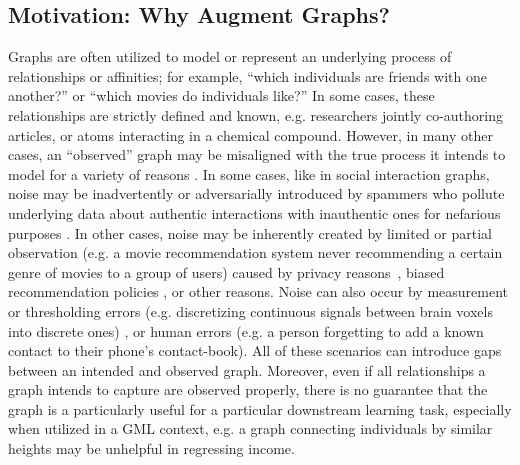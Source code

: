 \documentclass[11pt]{article}
\begin{document}
\subsection{Motivation: Why Augment Graphs?}
Graphs are often utilized to model or represent an underlying process of relationships or affinities; for example, ``which individuals are friends with one another?'' or ``which movies do individuals like?''  In some cases, these relationships are strictly defined and known, e.g. researchers jointly co-authoring articles, or atoms interacting in a chemical compound.  However, in many other cases, an ``observed'' graph may be misaligned with the true process it intends to model for a variety of reasons \cite{brugere2018network}.  In some cases, like in social interaction graphs, noise may be inadvertently or adversarially introduced by spammers who pollute underlying data about authentic interactions with inauthentic ones for nefarious purposes \cite{shah2014spotting, kumar2018false}.  In other cases, noise may be inherently created by limited or partial observation (e.g. a movie recommendation system never recommending a certain genre of movies to a group of users) caused by privacy reasons~\cite{chierichetti2015efficient,duong2011modeling}, 
biased recommendation policies \cite{joachims2016counterfactual, zhao2021counterfactual}, or other reasons.  Noise can also occur by measurement or thresholding errors (e.g. discretizing continuous signals between brain voxels into discrete ones) \cite{garrison2015stability}, or human errors (e.g. a person forgetting to add a known contact to their phone's contact-book).  All of these scenarios can introduce gaps between an intended and observed graph.  Moreover, even if all relationships a graph intends to capture are observed properly, there is no guarantee that the graph is a particularly useful \cite{brugere2018network} for a particular downstream learning task, especially when utilized in a GML context, e.g. a graph connecting individuals by similar heights may be unhelpful in regressing income.
\end{document}
